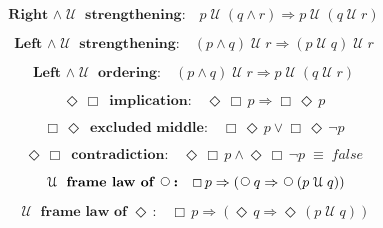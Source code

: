 \documentclass[12pt, fleqn, leqno]{article}
\newcommand{\equivs}{\ensuremath{\;\equiv\;}}       %
\newcommand{\impl}{\ensuremath{\Rightarrow}}        %
\newcommand{\Until}{\;\mathcal{U}\;}
\newcommand{\Next}{\;\,\text{\raisebox{3.5pt}{\circle{6}}}}
\newcommand{\Event}{\Diamond\,}
\newcommand{\Always}{\Box\,}
\newcommand{\spacer}{\vspace{-30pt}}
\begin{document}
\spacer

\begin{equation}\label{E:untilAndImplUntilUntil}
\textbf{Right $\land\Until$ strengthening:}\quad p\Until(q \land r) \impl p\Until(q\Until r)
\end{equation}

\spacer

\begin{equation}\label{E:andUntilImplUntilUntil}
\textbf{Left $\land\Until$ strengthening:}\quad (p \land q) \Until r \impl (p\Until q)\Until r
\end{equation}

\spacer

\begin{equation}\label{E:leftStrengthUntil}
\textbf{Left $\land\Until$ ordering:}\quad (p \land q) \Until r \impl p\Until (q\Until r)
\end{equation}

\spacer

\begin{equation}\label{E:eventAlwaysImp}
\textbf{$\Event \Always$ implication:}\quad \Event\Always p \impl \Always\Event p
\end{equation}

\spacer

\begin{equation}\label{E:AEexcludedMid2}
\textbf{$\Always \Event $ excluded middle:}\quad \Always \Event p \lor \Always \Event\neg p
\end{equation}

\spacer

\begin{equation}\label{E:EAcontradiction2}
\textbf{$\Event \Always$ contradiction:}\quad \Event \Always p \land \Event \Always \neg p \equivs false
\end{equation}

\spacer

\begin{equation}\label{E:untilframelawnext}
\textbf{$\Until$ frame law of $\Next$:}\quad \Always p \impl (\Next q \impl \Next (p \Until q))
\end{equation}

\spacer

\begin{equation}\label{E:untilframelawEvent}
\textbf{$\Until$ frame law of $\Event$:}\quad \Always p \impl (\Event q \impl \Event (p \Until q))
\end{equation}
\end{document}
